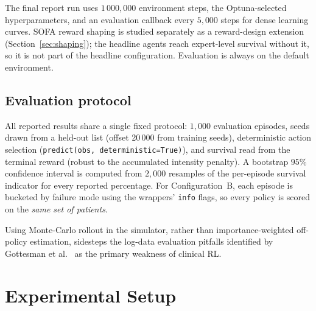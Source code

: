\documentclass[11pt,a4paper]{article}
\begin{document}
The final report run uses $1\,000{,}000$ environment steps, the Optuna-selected
hyperparameters, and an evaluation callback every $5{,}000$ steps for dense
learning curves. SOFA reward shaping is studied separately as a reward-design
extension (Section~\ref{sec:shaping}); the headline agents reach expert-level
survival without it, so it is not part of the headline configuration. Evaluation
is always on the default environment.

\subsection{Evaluation protocol}
\label{sec:eval}

All reported results share a single fixed protocol: $1{,}000$ evaluation episodes,
seeds drawn from a held-out list (offset 20\,000 from training seeds), deterministic
action selection (\texttt{predict(obs, deterministic=True)}), and survival read from
the terminal reward (robust to the accumulated intensity penalty). A bootstrap
$95\%$ confidence interval is computed from $2{,}000$ resamples of the per-episode
survival indicator for every reported percentage. For Configuration~B, each episode
is bucketed by failure mode using the wrappers' \texttt{info} flags, so every policy
is scored on the \emph{same set of patients}.

Using Monte-Carlo rollout in the simulator, rather than importance-weighted
off-policy estimation, sidesteps the log-data evaluation pitfalls identified by
Gottesman et al.\ \cite{gottesman2019} as the primary weakness of clinical RL.


\section{Experimental Setup}
\label{sec:setup}
\end{document}
